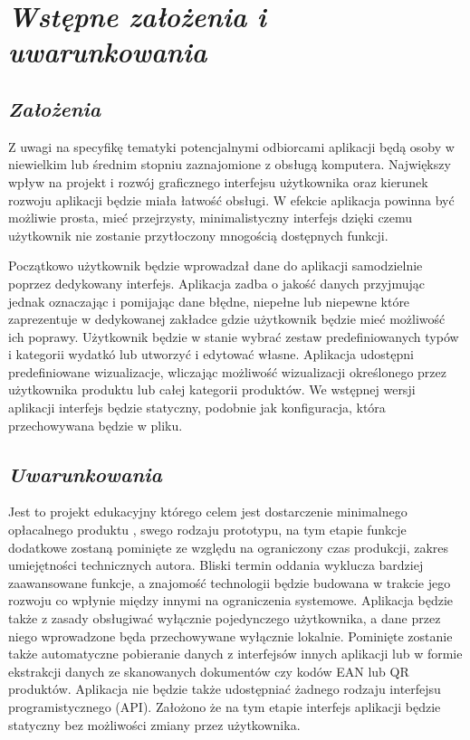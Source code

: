 \documentclass[a4paper,10pt, twoside]{report}
\newcommand{\customstylechapter}[1]{\large{\textit{#1}}}
\newcommand{\customstylesection}[1]{\textbf{\textit{#1}}}
\begin{document}

\chapter{\customstylechapter{Wstępne założenia i uwarunkowania}}
\section{\customstylesection{Założenia}}
{Z uwagi na specyfikę tematyki potencjalnymi odbiorcami aplikacji będą osoby 
w niewielkim lub średnim stopniu zaznajomione z obsługą komputera. Największy
wpływ na projekt i rozwój graficznego interfejsu użytkownika oraz kierunek
 rozwoju aplikacji będzie miała łatwość obsługi. W efekcie aplikacja powinna
 być możliwie prosta, mieć przejrzysty, minimalistyczny interfejs dzięki 
czemu użytkownik nie zostanie przytłoczony mnogością dostępnych funkcji.}

{Początkowo użytkownik będzie wprowadzał dane do aplikacji samodzielnie poprzez 
dedykowany interfejs. Aplikacja zadba o jakość danych przyjmując jednak 
oznaczając i pomijając dane błędne, niepełne lub niepewne które zaprezentuje w 
dedykowanej zakładce gdzie użytkownik będzie mieć możliwość ich poprawy. 
Użytkownik będzie w stanie wybrać zestaw predefiniowanych typów i kategorii 
wydatkó lub utworzyć i edytować własne. Aplikacja udostępni predefiniowane 
wizualizacje, wliczając możliwość wizualizacji określonego przez użytkownika 
produktu lub całej kategorii produktów. We wstępnej wersji aplikacji interfejs
będzie statyczny, podobnie jak konfiguracja, która przechowywana będzie w pliku.}

\section{\customstylesection{Uwarunkowania}}
{Jest to projekt edukacyjny którego celem jest dostarczenie minimalnego
 opłacalnego produktu \cite{MVP}, swego rodzaju prototypu, na tym etapie funkcje
 dodatkowe zostaną pominięte ze względu na ograniczony czas produkcji, zakres
 umiejętności technicznych autora. Bliski termin oddania wyklucza bardziej
 zaawansowane funkcje, a znajomość technologii będzie budowana w trakcie jego
 rozwoju co wpłynie między innymi na ograniczenia systemowe. Aplikacja będzie
 także z zasady obsługiwać wyłącznie pojedynczego użytkownika, a dane przez
 niego wprowadzone będa przechowywane wyłącznie lokalnie. Pominięte zostanie
 także automatyczne pobieranie danych z interfejsów innych aplikacji lub w
 formie ekstrakcji danych ze skanowanych dokumentów czy kodów EAN lub QR
 produktów. Aplikacja nie będzie także udostępniać żadnego rodzaju interfejsu 
programistycznego (API). Założono że na tym etapie interfejs aplikacji będzie statyczny bez
 możliwości zmiany przez użytkownika.}
\end{document}
